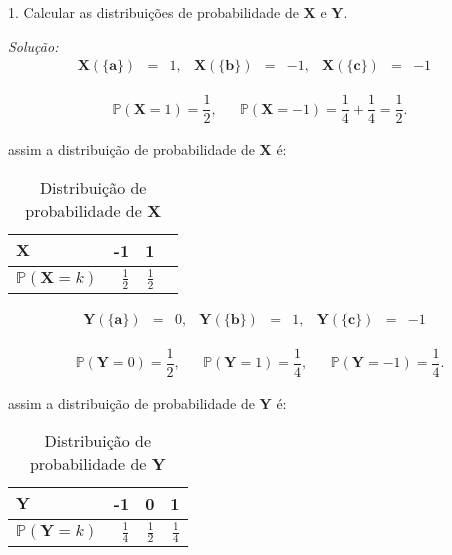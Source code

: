 \documentclass[a4paper, 11pt]{article}
\begin{document}
1. Calcular as distribuições de probabilidade de $\mathbf{X}$ e $\mathbf{Y}$.

\noindent
\textit{Solução:} \\
\begin{equation*}
\begin{array}{lcrrrrrrrrrrr}
\mathbf{X}(\mathbf{\{a\}}) & = & 1, & 
\mathbf{X}(\mathbf{\{b\}}) & = & -1, & 
\mathbf{X}(\mathbf{\{c\}}) & = & -1 & 
\end{array}
\end{equation*}

\begin{equation*}
\begin{array}{lclll}
\mathds{P}(\mathbf{X} = 1) = \dfrac{1}{2}, & & \mathds{P}(\mathbf{X} = -1) = \dfrac{1}{4} + \dfrac{1}{4} = \dfrac{1}{2}.
\end{array}
\end{equation*}

assim a distribuição de probabilidade de $\mathbf{X}$ é:

\begin{table}[H]
\caption{Distribuição de probabilidade de $\mathbf{X}$}\label{inference}
\centering
\begin{tabular}{lrrr}
\hline
$\mathbf{X}$ & -1 & 1   \\
\hline
$\mathds{P}(\mathbf{X} = k)$ & $\frac{1}{2}$ & $\frac{1}{2}$ \\
\hline
\end{tabular}
\end{table}

\begin{equation*}
\begin{array}{lcrrrrrrrrrrr}
\mathbf{Y}(\mathbf{\{a\}}) & = & 0, & 
\mathbf{Y}(\mathbf{\{b\}}) & = & 1, & 
\mathbf{Y}(\mathbf{\{c\}}) & = & -1 & 
\end{array}
\end{equation*}


\begin{equation*}
\begin{array}{lclll}
\mathds{P}(\mathbf{Y} = 0) = \dfrac{1}{2}, & & \mathds{P}(\mathbf{Y} = 1) = \dfrac{1}{4}, & & \mathds{P}(\mathbf{Y} = -1) =\dfrac{1}{4}.
\end{array}
\end{equation*}

assim a distribuição de probabilidade de $\mathbf{Y}$ é:

\begin{table}[H]
\caption{Distribuição de probabilidade de $\mathbf{Y}$}\label{inference}
\centering
\begin{tabular}{lrrr}
\hline
$\mathbf{Y}$ & -1 & 0 & 1   \\
\hline
$\mathds{P}(\mathbf{Y} = k)$ & $\frac{1}{4}$ & $\frac{1}{2}$ & $\frac{1}{4}$ \\

\hline
\end{tabular}
\end{table}
\end{document}
